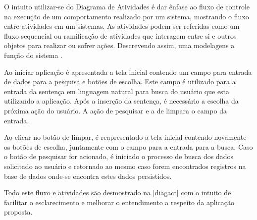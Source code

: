 O intuito utilizar-se do Diagrama de Atividades é dar ênfase ao fluxo de controle na execução de um comportamento realizado por um sistema, mostrando o fluxo entre atividades em um sistemas. As atividades podem ser referidas como um fluxo sequencial ou ramificação de atividades que interagem entre si e outros objetos para realizar ou sofrer ações. Descrevendo assim, uma modelagens a função do sistema \cite{Booch:2012}.  

Ao iniciar aplicação é apresentada a tela inicial contendo um campo para entrada de dados para a pesquisa e botões de escolha. Este campo é utilizado para a entrada da sentença em linguagem natural para busca do usuário que esta utilizando a aplicação. Após a inserção da sentença, é necessário a escolha da próxima ação do usuário. A ação de pesquisar e a de limpara o campo da entrada.

Ao clicar no botão de limpar, é reapresentado a tela inicial contendo novamente os botões de escolha, juntamente com o campo para a entrada para a busca. Caso o botão de pesquisar for acionado, é iniciado o processo de busca dos dados solicitado ao usuário e retornado ao mesmo caso forem encontrados registros na base de dados onde-se encontra estes dados persistidos.

Todo este fluxo e atividades são desmostrado na \autoref{diagact} com o intuito de facilitar o esclarecimento e melhorar o entendimento a respeito da aplicação proposta.
